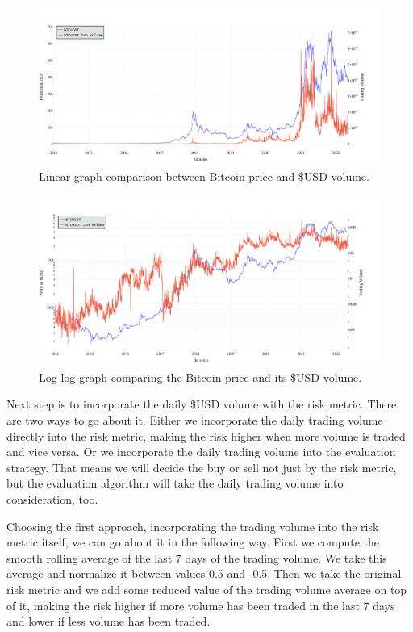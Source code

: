 \begin{figure}[!hbt]
    \centering
    \includegraphics[width=\columnwidth]{figures/24volume-lin.png}
    \caption{Linear graph comparison between Bitcoin price and \$USD volume.}
    \label{figure-24volume-lin}
\end{figure}

\begin{figure}[!hbt]
    \centering
    \includegraphics[width=\columnwidth]{figures/24volume-log.png}
    \caption{Log-log graph comparing the Bitcoin price and its \$USD volume.}
    \label{figure-24volume-log}
\end{figure}

Next step is to incorporate the daily \$USD volume with the risk metric. There are two ways to go about it. Either we incorporate the daily trading volume directly into the risk metric, making the risk higher when more volume is traded and vice versa. Or we incorporate the daily trading volume into the evaluation strategy. That means we will decide the buy or sell not just by the risk metric, but the evaluation algorithm will take the daily trading volume into consideration, too.

Choosing the first approach, incorporating the trading volume into the risk metric itself, we can go about it in the following way. First we compute the smooth rolling average of the last 7 days of the trading volume. We take this average and normalize it between values 0.5 and -0.5. Then we take the original risk metric and we add some reduced value of the trading volume average on top of it, making the risk higher if more volume has been traded in the last 7 days and lower if less volume has been traded.

